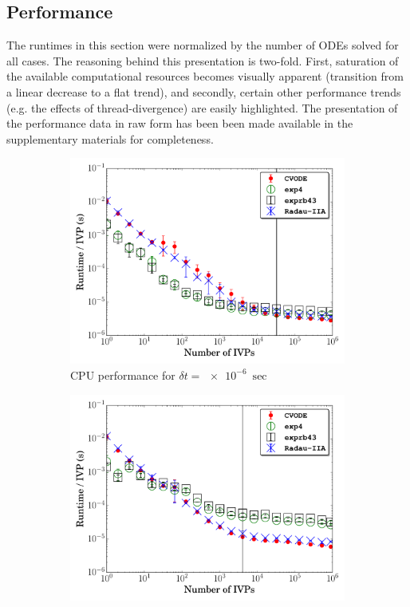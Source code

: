 \documentclass[final,twocolumn]{elsarticle}
\begin{document}
\subsection{Performance}
\ifmeasure
\addvspace{10pt}
\fi

The runtimes in this section were normalized by the number of ODEs solved for all cases.
The reasoning behind this presentation is two-fold.
First, saturation of the available computational resources becomes visually apparent (transition from a linear decrease to a flat trend), and secondly, certain other performance trends (e.g. the effects of thread-divergence) are easily highlighted.
The presentation of the performance data in raw form has been been made available in the supplementary materials for completeness.

\begin{figure}[htb]
  \ifmeasure
  \fontsize{8pt}{10pt}\selectfont
  \fi
  \centering
  \begin{subfigure}{0.49\textwidth}
      \includegraphics[width=\linewidth]{H2_1e-06_cpu.pdf}
      \caption{CPU performance for $\delta t = \SI{e-6}{\sec}$}
      \label{F:h2_cpu_perf_small}
  \end{subfigure}
  \begin{subfigure}{0.49\textwidth}
      \includegraphics[width=\linewidth]{H2_1e-04_cpu.pdf}

\end{subfigure}
\end{figure}
\end{document}
